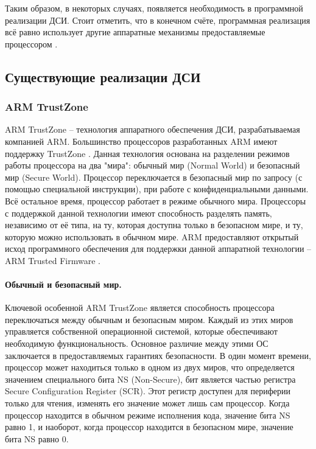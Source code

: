 Таким образом, в некоторых случаях, появляется необходимость в программной реализации ДСИ. Стоит отметить, что в конечном счёте, программная реализация всё равно использует другие аппаратные механизмы предоставляемые процессором \cite{comparsion-arm-intel}.
 
\subsection{Существующие реализации ДСИ}

\subsubsection{ARM TrustZone}\label{arm-trustzone}

ARM TrustZone -- технология аппаратного обеспечения ДСИ, разрабатываемая компанией ARM. Большинство процессоров разработанных ARM имеют поддержку TrustZone \cite{comparsion-arm-intel}. Данная технология основана на разделении режимов работы процессора на два "мира": обычный мир (Normal World) и безопасный мир (Secure World). Процессор переключается в безопасный мир по запросу (с помощью специальной инструкции), при работе с конфиденциальными данными. Всё остальное время, процессор работает в режиме обычного мира. Процессоры с поддержкой данной технологии имеют способность разделять память, независимо от её типа, на ту, которая доступна только в безопасном мире, и ту, которую можно использовать в обычном мире. ARM предоставляют открытый исход программного обеспечения для поддержки данной аппаратной технологии -- ARM Trusted Firmware \cite{arm-tfa}.

\paragraph{Обычный и безопасный мир.}

Ключевой особенной ARM TrustZone является способность процессора переключаться между обычным и безопасным миром. Каждый из этих миров управляется собственной операционной системой, которые обеспечивают необходимую функциональность. Основное различие между этими ОС заключается в предоставляемых гарантиях безопасности. В один момент времени, процессор может находиться только в одном из двух миров, что определяется значением специального бита NS (Non-Secure), бит является частью регистра Secure Configuration Register (SCR). Этот регистр доступен для периферии только для чтения, изменять его значение может лишь сам процессор. Когда процессор находится в обычном режиме исполнения кода, значение бита NS равно 1, и наоборот, когда процессор находится в безопасном мире, значение бита NS равно 0.

